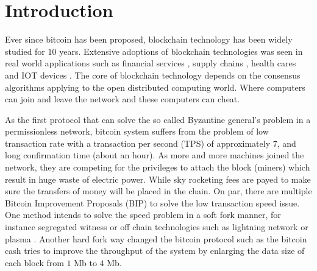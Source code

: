 \section{Introduction}
Ever since bitcoin \cite{nakamoto2008bitcoin} has been proposed, blockchain technology has been widely studied for $10$ years. 
Extensive adoptions of blockchain technologies was seen in real world applications such as 
financial services \cite{michael2018blockchain, tapscott2017blockchain}, 
supply chains \cite{korpela2017digital,tian2016agri, abeyratne2016blockchain}, 
health cares \cite{azaria2016medrec,yue2016healthcare} and IOT devices \cite{christidis2016blockchains}.
The core of blockchain technology depends on the consensus algorithms applying to the open distributed computing world.
Where computers can join and leave the network and these computers can cheat.

As the first protocol that can solve the so called Byzantine general's problem in a permissionless network, 
bitcoin system suffers from the problem of low transaction rate with a transaction per second (TPS) of approximately $7$, and long confirmation time (about an hour).
As more and more machines joined the network, they are competing for the privileges to attach the block (miners) which result in huge waste of electric power.
While sky rocketing fees are payed to make sure the transfers of money will be placed in the chain.
On par, there are multiple Bitcoin Improvement Proposals (BIP) to solve the low transaction speed issue. 
One method intends to solve the speed problem in a soft fork manner, for instance segregated witness \cite{lombrozo2015segregated} 
or off chain technologies such as lightning network \cite{poon2016bitcoin} or plasma \cite{poon2017plasma}. 
Another hard fork way changed the bitcoin protocol such as the bitcoin cash tries to improve the throughput of the system 
by enlarging the data size of each block from $1$ Mb to $4$ Mb. 


